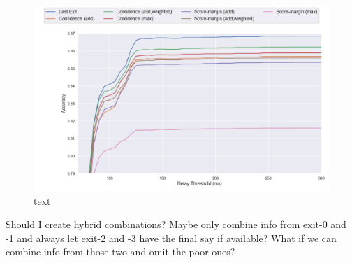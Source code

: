 \begin{figure}
	\centering
	\includegraphics[width=\linewidth]{figures/edge/information-combination.png}
	\caption[short text]{text}
	\label{fig:info-combi}
\end{figure}

Should I create hybrid combinations? Maybe only combine info from exit-0 and -1 and always let exit-2 and -3 have the final say if available? What if we can combine info from those two and omit the poor ones? 